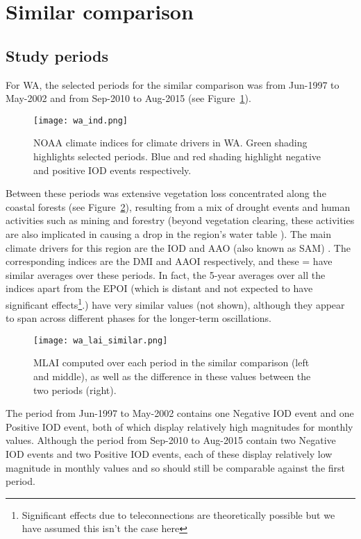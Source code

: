 \section{Similar comparison}

\subsection{Study periods}

For \ac{WA}, the selected periods for the similar comparison was from Jun-1997 to May-2002 and from Sep-2010 to Aug-2015 (see Figure~\ref{fig:wa_ind}). 

\begin{figure}[!ht]
	\centering
	\texttt{[image: wa\_ind.png]}
	\caption[WA's relevant climate indices for similar comparison]{\ac{NOAA} climate indices for climate drivers in \ac{WA}. Green shading highlights selected periods. Blue and red shading highlight negative and positive \ac{IOD} events respectively.}
	\label{fig:wa_ind}
\end{figure}

Between these periods was extensive vegetation loss concentrated along the coastal forests (see Figure~\ref{fig:wa_lai_similar}), resulting from a mix of drought events and human activities such as mining and forestry (beyond vegetation clearing, these activities are also implicated in causing a drop in the region's water table \citep{bauxite_hydro, johnson2003}). The main climate drivers for this region are the \ac{IOD} and \ac{AAO} (also known as \ac{SAM}) \citep{wa_drivers}. The corresponding indices are the \ac{DMI} and \ac{AAOI} respectively, and these = have similar averages over these periods. In fact, the 5-year averages over all the indices apart from the \ac{EPOI} (which is distant and not expected to have significant effects\footnote{Significant effects due to teleconnections are theoretically possible but we have assumed this isn't the case here}.) have very similar values (not shown), although they appear to span across different phases for the longer-term oscillations.

\begin{figure}[!ht]
	\centering
	\texttt{[image: wa\_lai\_similar.png]}
	\caption[MLAI similar comparison for WA focus region]{\ac{MLAI} computed over each period in the similar comparison (left and middle), as well as the difference in these values between the two periods (right).}
	\label{fig:wa_lai_similar}
\end{figure}

The period from Jun-1997 to May-2002 contains one Negative \ac{IOD} event and one Positive \ac{IOD} event, both of which display relatively high magnitudes for monthly values. Although the period from Sep-2010 to Aug-2015 contain two Negative \ac{IOD} events and two Positive \ac{IOD} events, each of these display relatively low magnitude in monthly values and so should still be comparable against the first period.

\enlargethispage{\baselineskip} %